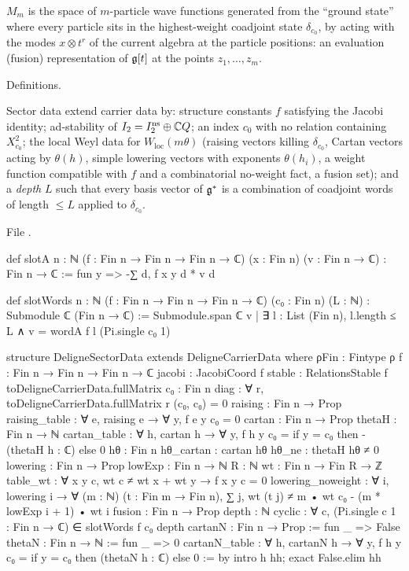 \begin{physics}
$M_m$ is the space of $m$-particle wave functions generated from the ``ground state'' where every particle sits in
the highest-weight coadjoint state $\delta_{c_0}$, by acting with the modes $x\otimes t^r$ of the current algebra at the particle positions:
an evaluation (fusion) representation of $\mathfrak g[t]$ at the points $z_1,\dots,z_m$.
\end{physics}

\begin{status}
Definitions.
\end{status}

\begin{definition}\label{l24:def:sectordata}
Sector data extend carrier data by: structure constants $f$ satisfying the Jacobi identity; ad-stability of
$I_2=I_2^{\mathrm{ns}}\oplus{\mathbb{C}} Q$; an index $c_0$ with no relation containing $X_{c_0}^2$; the local Weyl data for
$W_{\mathrm{loc}}(m\theta)$ (raising vectors killing $\delta_{c_0}$, Cartan vectors acting by $\theta(h)$, simple
lowering vectors with exponents $\theta(h_i)$, a weight function compatible with $f$ and a combinatorial
no-weight fact, a fusion set); and a \emph{depth} $L$ such that every basis vector of $\mathfrak g^*$ is a
combination of coadjoint words of length $\le L$ applied to $\delta_{c_0}$.
\end{definition}
\noindent File .
\begin{leancode}
def slotA {n : ℕ} (f : Fin n → Fin n → Fin n → ℂ) (x : Fin n) (v : Fin n → ℂ) : Fin n → ℂ :=
  fun y => -∑ d, f x y d * v d

def slotWords {n : ℕ} (f : Fin n → Fin n → Fin n → ℂ) (c₀ : Fin n) (L : ℕ) :
    Submodule ℂ (Fin n → ℂ) :=
  Submodule.span ℂ {v | ∃ l : List (Fin n), l.length ≤ L ∧ v = wordA f l (Pi.single c₀ 1)}

structure DeligneSectorData extends DeligneCarrierData where
  ρFin : Fintype ρ
  f : Fin n → Fin n → Fin n → ℂ
  jacobi : JacobiCoord f
  stable : RelationsStable f toDeligneCarrierData.fullMatrix
  c₀ : Fin n
  diag : ∀ r, toDeligneCarrierData.fullMatrix r (c₀, c₀) = 0
  raising : Fin n → Prop
  raising_table : ∀ e, raising e → ∀ y, f e y c₀ = 0
  cartan : Fin n → Prop
  thetaH : Fin n → ℕ
  cartan_table : ∀ h, cartan h → ∀ y, f h y c₀ = if y = c₀ then -(thetaH h : ℂ) else 0
  hθ : Fin n
  hθ_cartan : cartan hθ
  hθ_ne : thetaH hθ ≠ 0
  lowering : Fin n → Prop
  lowExp : Fin n → ℕ
  R : ℕ
  wt : Fin n → Fin R → ℤ
  table_wt : ∀ x y c, wt c ≠ wt x + wt y → f x y c = 0
  lowering_noweight : ∀ i, lowering i → ∀ (m : ℕ) (t : Fin m → Fin n),
    ∑ j, wt (t j) ≠ m • wt c₀ - (m * lowExp i + 1) • wt i
  fusion : Fin n → Prop
  depth : ℕ
  cyclic : ∀ c, (Pi.single c 1 : Fin n → ℂ) ∈ slotWords f c₀ depth
  cartanN : Fin n → Prop := fun _ => False
  thetaN : Fin n → ℕ := fun _ => 0
  cartanN_table : ∀ h, cartanN h → ∀ y, f h y c₀ = if y = c₀ then (thetaN h : ℂ) else 0 := by
    intro h hh; exact False.elim hh
\end{leancode}
